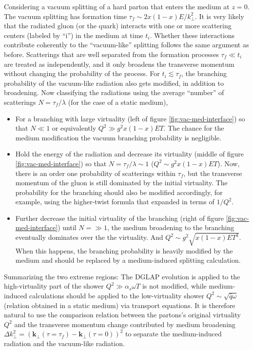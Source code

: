 Considering a vacuum splitting of a hard parton that enters the medium at $z=0$.
The vacuum splitting has formation time $\tau_f \sim 2x(1-x)E/k_\perp^2$.
It is very likely that the radiated gluon (or the quark) interacts with one or more scattering centers (labeled by ``i'') in the medium at time $t_i$.
Whether these interactions contribute coherently to the ``vacuum-like'' splitting follows the same argument as before.
Scatterings that are well separated from the formation processes $\tau_f \ll t_i$ are treated as independently, and it only broadens the transverse momentum without changing the probability of the process.
For $t_i \lesssim \tau_f$, the branching probability of the vacuum-like radiation also gets modified, in addition to broadening.
Now classifying the radiations using the average ``number'' of scatterings  $N = \tau_f/\lambda$ (for the case of a static medium),
\begin{itemize}
\item For a branching with large virtuality (left of figure \ref{fig:vac-med-interface}) so that $N \ll 1$ or equivalently $Q^2 \gg  g^2 x(1-x)E T$. 
The chance for the medium modification the vacuum branching probability is negligible. 
\item Hold the energy of the radiation and decrease its virtuality (middle of figure \ref{fig:vac-med-interface}) so that $N = \tau_f/\lambda \sim 1$ ($Q^2 \sim g^2 x(1-x)E T$). 
Now, there is an order one probability of scatterings within $\tau_f$, but the transverse momentum of the gluon is still dominated by the initial virtuality.
The probability for the branching should also be modified accordingly, for example, using the higher-twist formula that expanded in terms of $1/Q^2$.
\item Further decrease the initial virtuality of the branching (right of figure \ref{fig:vac-med-interface}) until $N = \gg 1$,
the medium broadening to the branching eventually dominates over the the virtuality.
And $Q^2 \sim g^2\sqrt{x(1-x)E T^3}$. 
When this happens, the branching probability is heavily modified by the medium and should be replaced by a medium-induced splitting calculation.
\end{itemize}
Summarizing the two extreme regions:
The DGLAP evolution is applied to the high-virtuality part of the shower $Q^2 \gg \alpha_s \omega T$ is not modified, while medium-induced calculations should be applied to the low-virtuality shower $Q^2 \sim \sqrt{\hat{q}\omega}$ (relation obtained in a static medium) via transport equations.
It is therefore natural to use the comparison relation between the partons's original virtuality $Q^2$ and the transverse momentum change contributed by medium broadening $\Delta k_\perp^2 = (\mathbf{k}_\perp(\tau=\tau_f) - \mathbf{k}_\perp(\tau=0))^2$ to separate the medium-induced radiation and the vacuum-like radiation.
